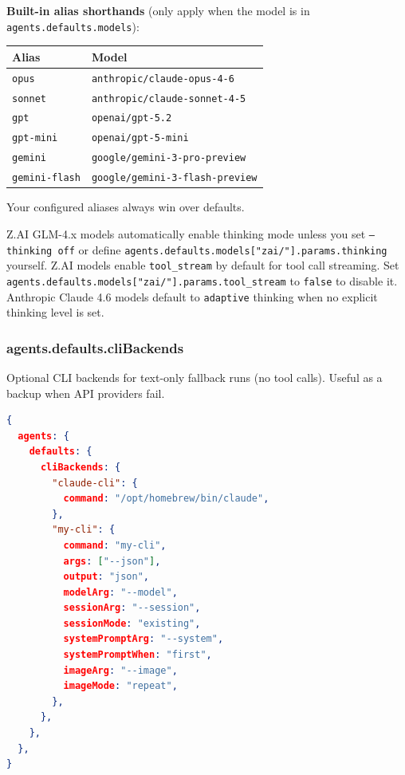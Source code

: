 \textbf{Built-in alias shorthands} (only apply when the model is in \texttt{agents.defaults.models}):


\begin{table}[h]
\centering
\small
\begin{tabular}{|l|l|}
\hline
Alias & Model \\
\hline
\texttt{opus} & \texttt{anthropic/claude-opus-4-6} \\
\hline
\texttt{sonnet} & \texttt{anthropic/claude-sonnet-4-5} \\
\hline
\texttt{gpt} & \texttt{openai/gpt-5.2} \\
\hline
\texttt{gpt-mini} & \texttt{openai/gpt-5-mini} \\
\hline
\texttt{gemini} & \texttt{google/gemini-3-pro-preview} \\
\hline
\texttt{gemini-flash} & \texttt{google/gemini-3-flash-preview} \\
\hline
\end{tabular}
\end{table}



Your configured aliases always win over defaults.

Z.AI GLM-4.x models automatically enable thinking mode unless you set \texttt{--thinking off} or define \texttt{agents.defaults.models["zai/"].params.thinking} yourself.
Z.AI models enable \texttt{tool\_stream} by default for tool call streaming. Set \texttt{agents.defaults.models["zai/"].params.tool\_stream} to \texttt{false} to disable it.
Anthropic Claude 4.6 models default to \texttt{adaptive} thinking when no explicit thinking level is set.

\subsubsection{agents.defaults.cliBackends}


Optional CLI backends for text-only fallback runs (no tool calls). Useful as a backup when API providers fail.

\begin{lstlisting}[language=json]
{
  agents: {
    defaults: {
      cliBackends: {
        "claude-cli": {
          command: "/opt/homebrew/bin/claude",
        },
        "my-cli": {
          command: "my-cli",
          args: ["--json"],
          output: "json",
          modelArg: "--model",
          sessionArg: "--session",
          sessionMode: "existing",
          systemPromptArg: "--system",
          systemPromptWhen: "first",
          imageArg: "--image",
          imageMode: "repeat",
        },
      },
    },
  },
}
\end{lstlisting}


